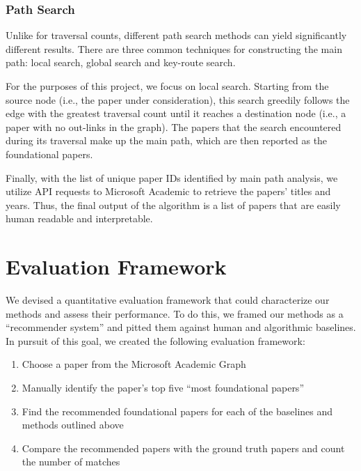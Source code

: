 \documentclass[lettepaper,]{article}
\providecommand{\tightlist}{%
  \setlength{\itemsep}{0pt}\setlength{\parskip}{0pt}}
\begin{document}
\hypertarget{path-search}{%
\subsubsection{Path Search}\label{path-search}}

Unlike for traversal counts, different path search methods can yield
significantly different results. There are three common techniques for
constructing the main path: local search, global search and key-route
search.

For the purposes of this project, we focus on local search. Starting
from the source node (i.e., the paper under consideration), this search
greedily follows the edge with the greatest traversal count until it
reaches a destination node (i.e., a paper with no out-links in the
graph). The papers that the search encountered during its traversal make
up the main path, which are then reported as the foundational papers.

Finally, with the list of unique paper IDs identified by main path
analysis, we utilize API requests to Microsoft Academic to retrieve the
papers' titles and years. Thus, the final output of the algorithm is a
list of papers that are easily human readable and interpretable.

\hypertarget{evaluation-framework}{%
\section{Evaluation Framework}\label{evaluation-framework}}

We devised a quantitative evaluation framework that could characterize
our methods and assess their performance. To do this, we framed our
methods as a ``recommender system'' and pitted them against human and
algorithmic baselines. In pursuit of this goal, we created the following
evaluation framework:

\begin{enumerate}
\def\labelenumi{\arabic{enumi}.}
\tightlist
\item
  Choose a paper from the Microsoft Academic Graph
\item
  Manually identify the paper's top five ``most foundational papers''
\item
  Find the recommended foundational papers for each of the baselines and
  methods outlined above
\item
  Compare the recommended papers with the ground truth papers and count
  the number of matches
\end{enumerate}
\end{document}
